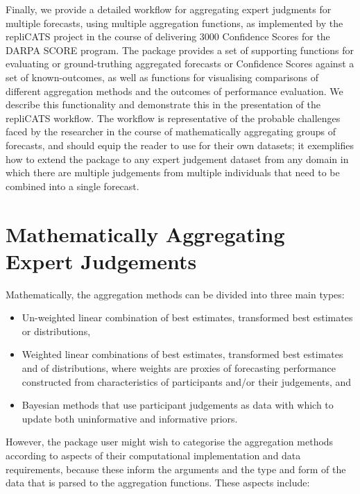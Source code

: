 \documentclass[article]{jss}
\begin{document}
Finally, we provide a detailed workflow for aggregating expert judgments
for multiple forecasts, using multiple aggregation functions, as
implemented by the repliCATS project in the course of delivering 3000
Confidence Scores for the DARPA SCORE program. The 
package provides a set of supporting functions for evaluating or
ground-truthing aggregated forecasts or Confidence Scores against a set
of known-outcomes, as well as functions for visualising comparisons of
different aggregation methods and the outcomes of performance
evaluation. We describe this functionality and demonstrate this in the
presentation of the repliCATS workflow. The workflow is representative
of the probable challenges faced by the researcher in the course of
mathematically aggregating groups of forecasts, and should equip the
reader to use  for their own datasets; it exemplifies how
to extend the  package to any expert judgement dataset
from any domain in which there are multiple judgements from multiple
individuals that need to be combined into a single forecast.

\hypertarget{mathematically-aggregating-expert-judgements}{%
\section{Mathematically Aggregating Expert
Judgements}\label{mathematically-aggregating-expert-judgements}}

Mathematically, the aggregation methods can be divided into three main
types:

\begin{itemize}
\item
  Un-weighted linear combination of best estimates, transformed best
  estimates or distributions,
\item
  Weighted linear combinations of best estimates, transformed best
  estimates and of distributions, where weights are proxies of
  forecasting performance constructed from characteristics of
  participants and/or their judgements, and
\item
  Bayesian methods that use participant judgements as data with which to
  update both uninformative and informative priors.
\end{itemize}

However, the  package user might wish to categorise the
aggregation methods according to aspects of their computational
implementation and data requirements, because these inform the arguments
and the type and form of the data that is parsed to the aggregation
functions. These aspects include:
\end{document}
